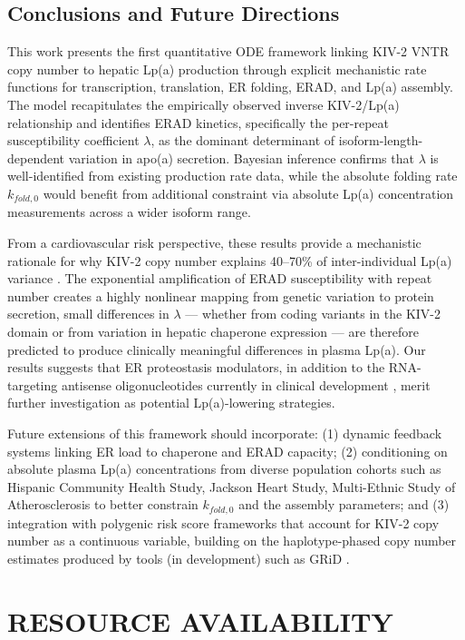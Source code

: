 \documentclass[12pt,letterpaper]{article}
\begin{document}
\subsection{Conclusions and Future Directions}

This work presents the first quantitative ODE framework linking KIV-2 VNTR copy number to hepatic Lp(a) production through explicit mechanistic rate functions for transcription, translation, ER folding, ERAD, and Lp(a) assembly. The model recapitulates the empirically observed inverse KIV-2/Lp(a) relationship and identifies ERAD kinetics, specifically the per-repeat susceptibility coefficient $\lambda$, as the dominant determinant of isoform-length-dependent variation in apo(a) secretion. Bayesian inference confirms that $\lambda$ is well-identified from existing production rate data, while the absolute folding rate $k_{fold,0}$ would benefit from additional constraint via absolute Lp(a) concentration measurements across a wider isoform range.

From a cardiovascular risk perspective, these results provide a mechanistic rationale for why KIV-2 copy number explains 40--70\% of inter-individual Lp(a) variance \citep{schmidt2016structure,utermann1987lp}. The exponential amplification of ERAD susceptibility with repeat number creates a highly nonlinear mapping from genetic variation to protein secretion, small differences in $\lambda$ — whether from coding variants in the KIV-2 domain or from variation in hepatic chaperone expression — are therefore predicted to produce clinically meaningful differences in plasma Lp(a). Our results suggests that ER proteostasis modulators, in addition to the RNA-targeting antisense oligonucleotides currently in clinical development \citep{graham2016antisense}, merit further investigation as potential Lp(a)-lowering strategies.

Future extensions of this framework should incorporate: (1) dynamic feedback systems linking ER load to chaperone and ERAD capacity; (2) conditioning on absolute plasma Lp(a) concentrations from diverse population cohorts such as Hispanic Community Health Study, Jackson Heart Study, Multi-Ethnic Study of Atherosclerosis to better constrain $k_{fold,0}$ and the assembly parameters; and (3) integration with polygenic risk score frameworks that account for KIV-2 copy number as a continuous variable, building on the haplotype-phased copy number estimates produced by tools (in development) such as GRiD \citep{GRID}.

\section*{RESOURCE AVAILABILITY}
\end{document}
